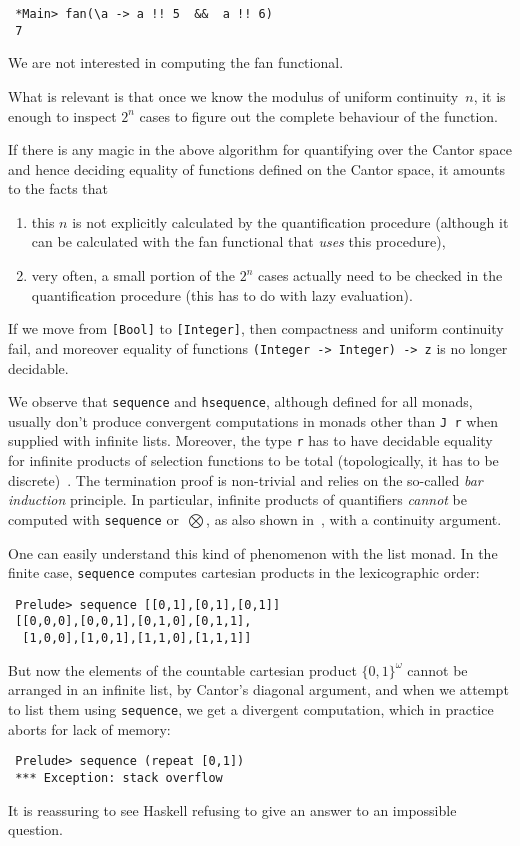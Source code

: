 \begin{verbatim}
 *Main> fan(\a -> a !! 5  &&  a !! 6)
 7
\end{verbatim}



We are not interested in computing the fan functional.  

What
is relevant is that once we know the modulus of uniform
continuity~$n$, it is enough to inspect $2^n$ cases to figure out the
complete behaviour of the function. 


If there is any magic in the above
algorithm for quantifying over the Cantor space and hence deciding
equality of functions defined on the Cantor space, it amounts to the
facts that 
\begin{enumerate}
\item 
this $n$ is not explicitly calculated by the
quantification procedure (although it can be calculated with the fan
functional that \emph{uses} this procedure), 
\item
very often, a
small portion of the $2^n$ cases actually need to be checked in the
quantification procedure (this has to do with lazy evaluation).  
\end{enumerate}
If we
move from \verb+[Bool]+ to \verb+[Integer]+, then compactness and
uniform continuity fail, and moreover equality of functions
\verb+(Integer -> Integer) -> z+ is no longer decidable.

\overhead{}

We observe that \verb+sequence+ and \verb+hsequence+, although defined
for all monads, usually don't produce convergent computations in
monads other than \verb+J r+ when supplied with infinite lists.
Moreover, the type \verb+r+ has to have decidable equality for
infinite products of selection functions to be total (topologically,
it has to be discrete)~\cite{EO(2009)}. The termination proof
is non-trivial and relies on the so-called \emph{bar induction}
principle. In particular, infinite products of quantifiers
\emph{cannot} be computed with \verb+sequence+ or~$\bigotimes$, as
also shown in~\cite{EO(2009)}, with a continuity argument.

One can easily understand this kind of phenomenon with the list monad.
In the finite case, \verb+sequence+ computes cartesian products in the
lexicographic order:
\begin{verbatim}
 Prelude> sequence [[0,1],[0,1],[0,1]]      
 [[0,0,0],[0,0,1],[0,1,0],[0,1,1],
  [1,0,0],[1,0,1],[1,1,0],[1,1,1]]
\end{verbatim}
But now the elements of the countable cartesian product
$\{0,1\}^\omega$ cannot be arranged in an infinite list, by Cantor's
diagonal argument, and when we attempt to list them using
\verb+sequence+, we get a divergent computation, which in practice
aborts for lack of memory:
\begin{verbatim}
 Prelude> sequence (repeat [0,1])        
 *** Exception: stack overflow
\end{verbatim}
It is reassuring to see Haskell refusing to give an answer to an
impossible question.

